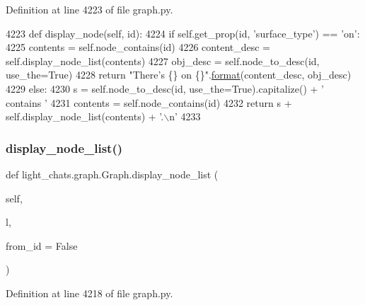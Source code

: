 Definition at line 4223 of file graph.\+py.


\begin{DoxyCode}
4223     \textcolor{keyword}{def }display\_node(self, id):
4224         \textcolor{keywordflow}{if} self.get\_prop(id, \textcolor{stringliteral}{'surface\_type'}) == \textcolor{stringliteral}{'on'}:
4225             contents = self.node\_contains(id)
4226             content\_desc = self.display\_node\_list(contents)
4227             obj\_desc = self.node\_to\_desc(id, use\_the=\textcolor{keyword}{True})
4228             \textcolor{keywordflow}{return} \textcolor{stringliteral}{"There's \{\} on \{\}"}.\hyperlink{namespaceparlai_1_1chat__service_1_1services_1_1messenger_1_1shared__utils_a32e2e2022b824fbaf80c747160b52a76}{format}(content\_desc, obj\_desc)
4229         \textcolor{keywordflow}{else}:
4230             s = self.node\_to\_desc(id, use\_the=\textcolor{keyword}{True}).capitalize() + \textcolor{stringliteral}{' contains '}
4231             contents = self.node\_contains(id)
4232             \textcolor{keywordflow}{return} s + self.display\_node\_list(contents) + \textcolor{stringliteral}{'.\(\backslash\)n'}
4233 
\end{DoxyCode}
\mbox{\label{classlight__chats_1_1graph_1_1Graph_a9c3ce0d845610e465f9a5d9bee1cbd23}} 
\subsubsection{\texorpdfstring{display\+\_\+node\+\_\+list()}{display\_node\_list()}}
{\footnotesize\ttfamily def light\+\_\+chats.\+graph.\+Graph.\+display\+\_\+node\+\_\+list (\begin{DoxyParamCaption}\item[{}]{self,  }\item[{}]{l,  }\item[{}]{from\+\_\+id = {\ttfamily False} }\end{DoxyParamCaption})}



Definition at line 4218 of file graph.\+py.


